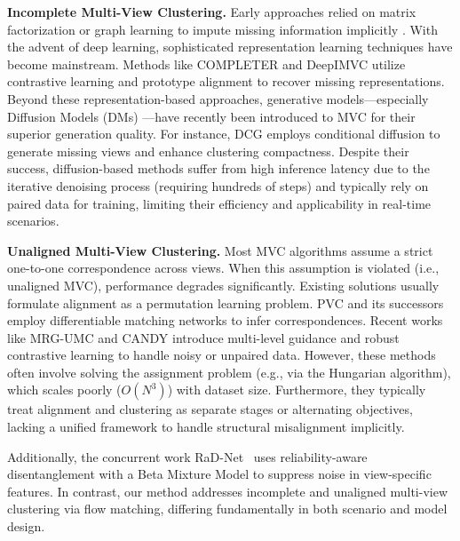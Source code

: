 \documentclass{article}
\theoremstyle{plain}
\theoremstyle{definition}
\theoremstyle{remark}
\begin{document}
\textbf{Incomplete Multi-View Clustering.} Early approaches relied on matrix factorization or graph learning to impute missing information implicitly \cite{yangRobustMultiViewClustering2023}. With the advent of deep learning, sophisticated representation learning techniques have become mainstream. Methods like COMPLETER \cite{linCOMPLETERIncompleteMultiview2021} and DeepIMVC \cite{yangDealMVCDualContrastive2023} utilize contrastive learning and prototype alignment to recover missing representations. Beyond these representation-based approaches, generative models—especially Diffusion Models (DMs) \cite{hoDenoisingDiffusionProbabilistic2020b, limScorebasedGenerativeModeling2023}—have recently been introduced to MVC for their superior generation quality. For instance, DCG \cite{zhangIncompleteMultiviewClustering2025a} employs conditional diffusion to generate missing views and enhance clustering compactness. 
Despite their success, diffusion-based methods suffer from high inference latency due to the iterative denoising process (requiring hundreds of steps) and typically rely on paired data for training, limiting their efficiency and applicability in real-time scenarios.

\textbf{Unaligned Multi-View Clustering.} Most MVC algorithms assume a strict one-to-one correspondence across views. When this assumption is violated (i.e., unaligned MVC), performance degrades significantly. Existing solutions usually formulate alignment as a permutation learning problem. PVC \cite{huangPartiallyViewalignedClustering2020a} and its successors employ differentiable matching networks to infer correspondences. Recent works like MRG-UMC \cite{xinMultilevelReliableGuidance2025} and CANDY \cite{guoRobustContrastiveMultiview2024a} introduce multi-level guidance and robust contrastive learning to handle noisy or unpaired data. 
However, these methods often involve solving the assignment problem (e.g., via the Hungarian algorithm), which scales poorly ($O(N^3)$) with dataset size. Furthermore, they typically treat alignment and clustering as separate stages or alternating objectives, lacking a unified framework to handle structural misalignment implicitly.

Additionally, the concurrent work RaD-Net~\cite{anonymousRadNetReliabilityAware2026} uses reliability-aware disentanglement with a Beta Mixture Model to suppress noise in view-specific features. 
In contrast, our method addresses incomplete and unaligned multi-view clustering via flow matching, differing fundamentally in both scenario and model design. 
\end{document}
